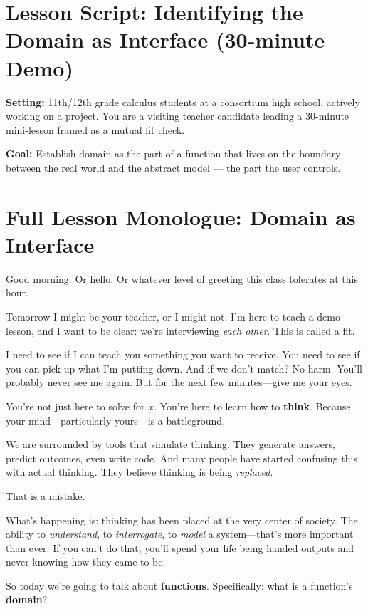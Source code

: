 \documentclass[12pt]{article}
\begin{document}
\section*{Lesson Script: Identifying the Domain as Interface (30-minute Demo)}

\textbf{Setting:} 11th/12th grade calculus students at a consortium high school, actively working on a project. You are a visiting teacher candidate leading a 30-minute mini-lesson framed as a mutual fit check.

\textbf{Goal:} Establish domain as the part of a function that lives on the boundary between the real world and the abstract model — the part the user controls.

\section*{Full Lesson Monologue: Domain as Interface}

Good morning. Or hello. Or whatever level of greeting this class tolerates at this hour.

Tomorrow I might be your teacher, or I might not. I’m here to teach a demo lesson, and I want to be clear: we’re interviewing \textit{each other}. This is called a fit.

I need to see if I can teach you something you want to receive. You need to see if you can pick up what I’m putting down. And if we don’t match? No harm. You’ll probably never see me again. But for the next few minutes—give me your eyes.

You’re not just here to solve for \( x \). You're here to learn how to \textbf{think}. Because your mind—particularly yours—is a battleground.

We are surrounded by tools that simulate thinking. They generate answers, predict outcomes, even write code. And many people have started confusing this with actual thinking. They believe thinking is being \textit{replaced}.

That is a mistake.

What’s happening is: thinking has been placed at the very center of society. The ability to \textit{understand}, to \textit{interrogate}, to \textit{model} a system—that’s more important than ever. If you can’t do that, you’ll spend your life being handed outputs and never knowing how they came to be.

So today we’re going to talk about \textbf{functions}. Specifically: what is a function’s \textbf{domain}?
\end{document}
